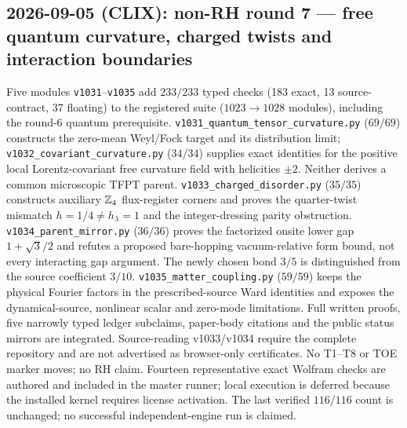 \documentclass[11pt]{article}
\begin{document}
\subsection*{2026-09-05 (CLIX): non-RH round 7 --- free quantum curvature, charged twists and interaction boundaries}
Five modules \texttt{v1031}--\texttt{v1035} add $233/233$ typed checks
(183 exact, 13 source-contract, 37 floating) to the registered suite
($1023\to1028$ modules), including the round-6 quantum prerequisite.
\texttt{v1031\_quantum\_tensor\_curvature.py} ($69/69$) constructs the
zero-mean Weyl/Fock target and its distribution limit;
\texttt{v1032\_covariant\_curvature.py} ($34/34$) supplies exact
identities for the positive local Lorentz-covariant free curvature field
with helicities $\pm2$. Neither derives a common microscopic TFPT parent.
\texttt{v1033\_charged\_disorder.py} ($35/35$) constructs auxiliary
$\mathbb{Z}_4$ flux-register corners and proves the quarter-twist mismatch
$h=1/4\ne h_\lambda=1$ and the integer-dressing parity obstruction.
\texttt{v1034\_parent\_mirror.py} ($36/36$) proves the factorized
onsite lower gap $1+\sqrt3/2$ and refutes a proposed bare-hopping
vacuum-relative form bound, not every interacting gap argument. The
newly chosen bond $3/5$ is distinguished from the source coefficient $3/10$.
\texttt{v1035\_matter\_coupling.py} ($59/59$) keeps the physical
Fourier factors in the prescribed-source Ward identities and exposes
the dynamical-source, nonlinear scalar and zero-mode limitations.
Full written proofs, five narrowly typed ledger subclaims, paper-body
citations and the public status mirrors are integrated. Source-reading
v1033/v1034 require the complete repository and are not advertised as
browser-only certificates. No T1--T8 or TOE marker moves; no RH claim.
Fourteen representative exact Wolfram checks are authored and included in
the master runner; local execution is deferred because the installed
kernel requires license activation. The last verified $116/116$ count
is unchanged; no successful independent-engine run is claimed.
\end{document}

